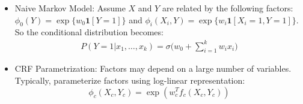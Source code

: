 \documentclass{article}
\begin{document}
\begin{itemize}
    \item Naive Markov Model: Assume $X$ and $Y$ are related by the following factors: $\phi_0(Y) = \exp\{w_0 \mathbf{1}[Y = 1]\}$ and $\phi_i(X_i, Y) = \exp\{w_i \mathbf{1}[X_i = 1, Y = 1]\}$. So the conditional distribution becomes: \begin{align*}
        P(Y = 1|x_1, \dots, x_k) = \sigma \bigg( w_0 + \sum_{i = 1}^{k}w_ix_i \bigg)
    \end{align*}
    \item CRF Parametrization: Factors may depend on a large number of variables. Typically, parameterize factors using log-linear representation: \begin{equation*}
        \phi_c(X_c, Y_c) = \exp(w_c^T f_c(X_c, Y_c))
    \end{equation*}
\end{itemize}
\end{document}
